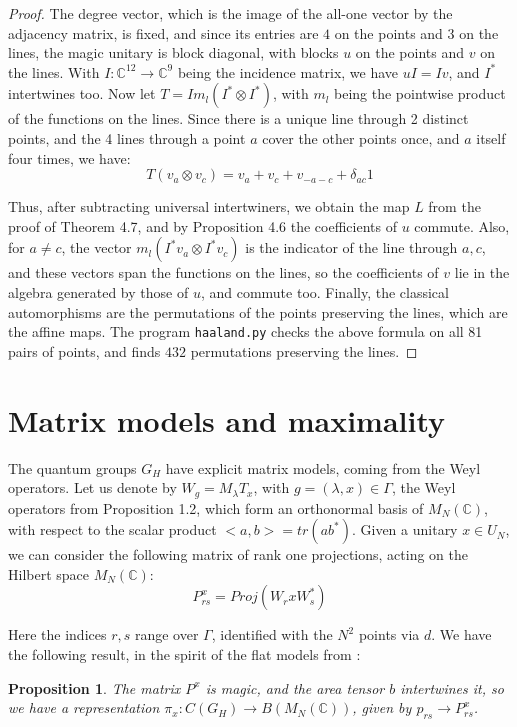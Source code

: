 \documentclass[11pt]{amsart}
\newtheorem{proposition}[theorem]{Proposition}
\theoremstyle{definition}
\begin{document}
\begin{proof}
The degree vector, which is the image of the all-one vector by the adjacency matrix, is fixed, and since its entries are $4$ on the points and $3$ on the lines, the magic unitary is block diagonal, with blocks $u$ on the points and $v$ on the lines. With $I:\mathbb C^{12}\to\mathbb C^9$ being the incidence matrix, we have $uI=Iv$, and $I^*$ intertwines too. Now let $T=Im_l(I^*\otimes I^*)$, with $m_l$ being the pointwise product of the functions on the lines. Since there is a unique line through 2 distinct points, and the 4 lines through a point $a$ cover the other points once, and $a$ itself four times, we have:
$$T(v_a\otimes v_c)=v_a+v_c+v_{-a-c}+\delta_{ac}1$$

Thus, after subtracting universal intertwiners, we obtain the map $L$ from the proof of Theorem 4.7, and by Proposition 4.6 the coefficients of $u$ commute. Also, for $a\neq c$, the vector $m_l(I^*v_a\otimes I^*v_c)$ is the indicator of the line through $a,c$, and these vectors span the functions on the lines, so the coefficients of $v$ lie in the algebra generated by those of $u$, and commute too. Finally, the classical automorphisms are the permutations of the points preserving the lines, which are the affine maps. The program {\tt haaland.py} checks the above formula on all 81 pairs of points, and finds $432$ permutations preserving the lines.
\end{proof}

\section{Matrix models and maximality}

The quantum groups $G_H$ have explicit matrix models, coming from the Weyl operators. Let us denote by $W_g=M_\lambda T_x$, with $g=(\lambda,x)\in\Gamma$, the Weyl operators from Proposition 1.2, which form an orthonormal basis of $M_N(\mathbb C)$, with respect to the scalar product $<a,b>=tr(ab^*)$. Given a unitary $x\in U_N$, we can consider the following matrix of rank one projections, acting on the Hilbert space $M_N(\mathbb C)$:
$$P^x_{rs}=Proj(W_rxW_s^*)$$

Here the indices $r,s$ range over $\Gamma$, identified with the $N^2$ points via $d$. We have the following result, in the spirit of the flat models from \cite{bne}:

\begin{proposition}
The matrix $P^x$ is magic, and the area tensor $b$ intertwines it, so we have a representation $\pi_x:C(G_H)\to B(M_N(\mathbb C))$, given by $p_{rs}\to P^x_{rs}$.
\end{proposition}
\end{document}
